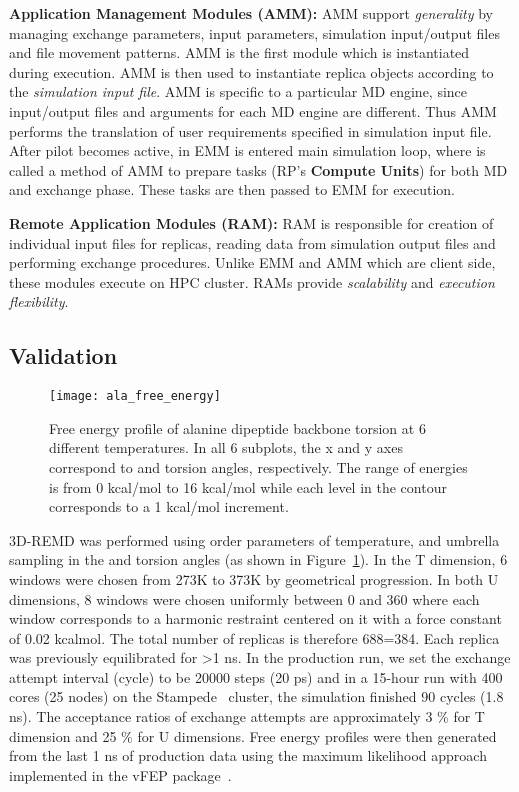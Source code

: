 \documentclass{sig-alternate-05-2015}
\begin{document}
{\bf Application Management Modules (AMM):} AMM support {\it generality} by managing exchange parameters, input parameters, simulation input/output files and file movement patterns. AMM is the first module which is instantiated during execution. AMM is then used to instantiate replica objects according to the {\it simulation input file}. AMM is specific to a particular MD engine, since input/output files and arguments for each MD engine are different. Thus AMM performs the translation of user requirements specified in simulation input file.  After pilot becomes active, in EMM is entered main simulation loop, where is called a method of AMM to prepare tasks (RP's \textbf{Compute Units}) for both MD and exchange phase. These tasks are then passed to EMM for execution.
    
{\bf Remote Application Modules (RAM):} RAM is responsible for creation of individual input files for replicas, reading data from simulation output files and performing exchange procedures. Unlike EMM and AMM which are client side, these modules execute on HPC cluster.  RAMs provide {\it scalability} and {\it execution flexibility}.

\subsection{Validation} \label{validation}

\begin{figure}
   \centering
   \texttt{[image: ala\_free\_energy]}
   \caption{\small{Free energy profile of alanine dipeptide backbone torsion at 6 different temperatures. In all 6 subplots, the x and y axes correspond to  and  torsion angles, respectively. The range of energies is from 0 kcal/mol to 16 kcal/mol while each level in the contour corresponds to a 1 kcal/mol increment.}}{\label{fig:energy_maps}}
\end{figure}

3D-REMD was performed using order parameters of temperature, and umbrella sampling in the  and  torsion angles (as shown in Figure~\ref{fig:energy_maps}). In the T dimension, 6 windows were chosen from 273K to 373K by geometrical progression. In both U dimensions, 8 windows were chosen uniformly between 0 and 360 where each window corresponds to a harmonic restraint centered on it with a force constant of 0.02 kcalmol. The total number of replicas is therefore 688=384. Each replica was previously equilibrated for >1 ns. In the production run, we set the exchange attempt interval (cycle) to be 20000 steps (20 ps) and in a 15-hour run with 400 cores (25 nodes) on the Stampede~\cite{xsede} cluster, the simulation finished 90 cycles (1.8 ns). The acceptance ratios of exchange attempts are approximately 3 \% for T dimension and 25 \% for U dimensions. Free energy profiles were then generated from the last 1 ns of production data using the maximum likelihood approach implemented in the vFEP package~\cite{Lee_JChemTheoryComput_2013_v9_p153,Lee_JChemTheoryComput_2014_v10_p24}.
\end{document}
